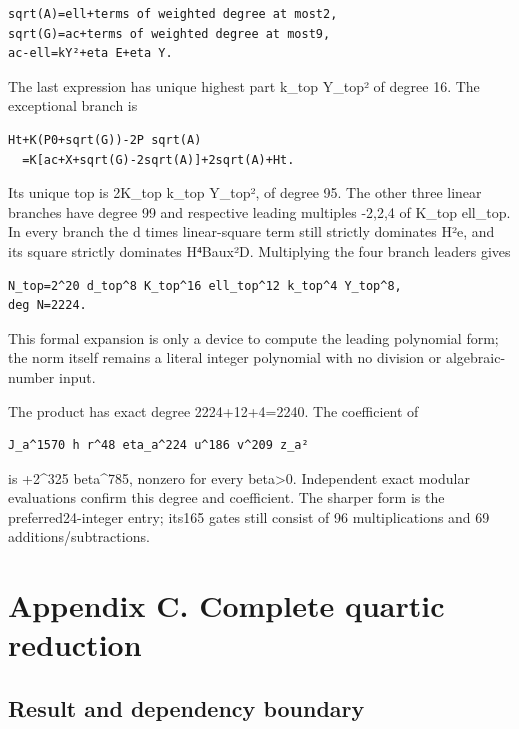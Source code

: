 \documentclass[
  10pt,
]{article}
\let\oldsection\section
\renewcommand{\section}{\clearpage\oldsection}
\begin{document}
\begin{verbatim}
sqrt(A)=ell+terms of weighted degree at most2,
sqrt(G)=ac+terms of weighted degree at most9,
ac-ell=kY²+eta E+eta Y.
\end{verbatim}

The last expression has unique highest part k\_top Y\_top² of degree 16.
The exceptional branch is

\begin{verbatim}
Ht+K(P0+sqrt(G))-2P sqrt(A)
  =K[ac+X+sqrt(G)-2sqrt(A)]+2sqrt(A)+Ht.
\end{verbatim}

Its unique top is 2K\_top k\_top Y\_top², of degree 95. The other three
linear branches have degree 99 and respective leading multiples -2,2,4
of K\_top ell\_top. In every branch the d times linear-square term still
strictly dominates H²e, and its square strictly dominates H⁴Baux²D.
Multiplying the four branch leaders gives

\begin{verbatim}
N_top=2^20 d_top^8 K_top^16 ell_top^12 k_top^4 Y_top^8,
deg N=2224.
\end{verbatim}

This formal expansion is only a device to compute the leading polynomial
form; the norm itself remains a literal integer polynomial with no
division or algebraic-number input.

The product has exact degree 2224+12+4=2240. The coefficient of

\begin{verbatim}
J_a^1570 h r^48 eta_a^224 u^186 v^209 z_a²
\end{verbatim}

is +2\^{}325 beta\^{}785, nonzero for every beta\textgreater0.
Independent exact modular evaluations confirm this degree and
coefficient. The sharper form is the preferred24-integer entry; its165
gates still consist of 96 multiplications and 69 additions/subtractions.

\section{Appendix C. Complete quartic
reduction}\label{appendix-c.-complete-quartic-reduction}

\subsection{Result and dependency
boundary}\label{result-and-dependency-boundary}
\end{document}

